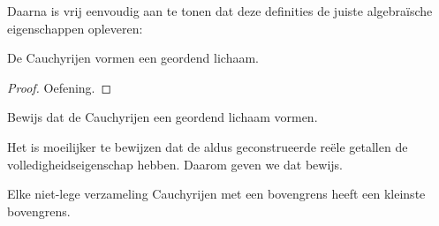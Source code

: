 \documentclass[../../../include/open-logic-section]{subfiles}
\begin{document}
Daarna is vrij eenvoudig aan te tonen dat deze definities de juiste
algebraïsche eigenschappen opleveren:
\begin{thm}
De Cauchyrijen vormen een geordend lichaam.
\end{thm}
\begin{proof}
Oefening.
\end{proof}
\begin{prob}
Bewijs dat de Cauchyrijen een geordend lichaam vormen.
\end{prob}
Het is moeilijker te bewijzen dat de aldus geconstrueerde reële
getallen de volledigheidseigenschap hebben. Daarom geven we dat bewijs.
\begin{thm}
Elke niet-lege verzameling Cauchyrijen met een bovengrens heeft een
kleinste bovengrens.
\end{thm}
\end{document}
